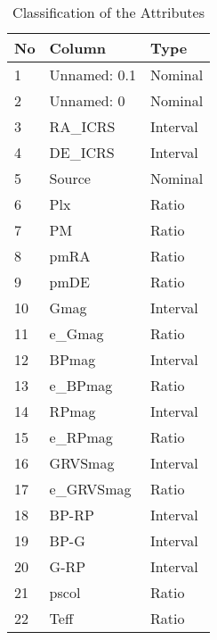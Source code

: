 \begin{table}[]
\centering
\caption{Classification of the Attributes}\label{table:column-types}
\scriptsize
\begin{tabular}{lll}
\hline
\textbf{No} & \textbf{Column} & \textbf{Type} \\
\hline
1           & Unnamed: 0.1         & Nominal                 \\
2           & Unnamed: 0           & Nominal                 \\
3           & RA\_ICRS             & Interval                \\
4           & DE\_ICRS             & Interval                \\
5           & Source               & Nominal                 \\
6           & Plx                  & Ratio                   \\
7           & PM                   & Ratio                   \\
8           & pmRA                 & Ratio                \\
9           & pmDE                 & Ratio                \\
10          & Gmag                 & Interval                   \\
11          & e\_Gmag              & Ratio                   \\
12          & BPmag                & Interval                   \\
13          & e\_BPmag             & Ratio                   \\
14          & RPmag                & Interval                   \\
15          & e\_RPmag             & Ratio                   \\
16          & GRVSmag              & Interval                   \\
17          & e\_GRVSmag           & Ratio                   \\
18          & BP-RP                & Interval                \\
19          & BP-G                 & Interval                \\
20          & G-RP                 & Interval                \\
21          & pscol                & Ratio                   \\
22          & Teff                 & Ratio                   \\

\end{tabular}
\end{table}
